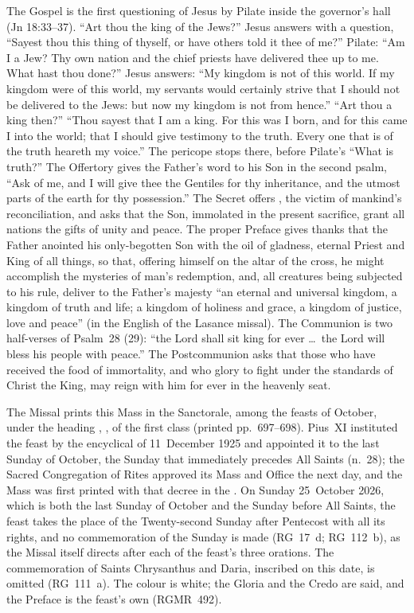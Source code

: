 The Gospel is the first questioning of Jesus by Pilate inside the governor's
hall (Jn 18:33--37). ``Art thou the king of the Jews?'' Jesus answers with a
question, ``Sayest thou this thing of thyself, or have others told it thee of
me?'' Pilate: ``Am I a Jew? Thy own nation and the chief priests have
delivered thee up to me. What hast thou done?'' Jesus answers: ``My kingdom is not of this world. If my kingdom were of this
world, my servants would certainly strive that I should not be delivered to
the Jews: but now my kingdom is not from hence.'' ``Art thou a king then?''
``Thou sayest that I am a king. For this was I born, and for this came I into
the world; that I should give testimony to the truth. Every one that is of
the truth heareth my voice.'' The pericope stops there, before Pilate's ``What
is truth?'' The Offertory gives the Father's word to his Son in the second
psalm, ``Ask of me, and I will give thee the Gentiles for thy inheritance, and
the utmost parts of the earth for thy possession.'' The Secret offers
, the victim of mankind's
reconciliation, and asks that the Son, immolated in the present sacrifice,
grant all nations the gifts of unity and peace. The proper Preface gives
thanks that the Father anointed his only-begotten Son with the oil of
gladness, eternal Priest and King of all things, so that, offering himself
on the altar of the cross, he might accomplish the mysteries of man's
redemption, and, all creatures being subjected to his rule, deliver to the
Father's majesty ``an eternal and universal kingdom, a kingdom of truth and
life; a kingdom of holiness and grace, a kingdom of justice, love and peace''
(in the English of the Lasance missal). The Communion is two half-verses of
Psalm~28 (29): ``the Lord shall sit king for ever \dots\ the Lord will bless
his people with peace.'' The Postcommunion asks that those who have received
the food of immortality, and who glory to fight under the standards of
Christ the King, may reign with him for ever in the heavenly seat.

The Missal prints this Mass in the Sanctorale, among the feasts of October,
under the heading , , of the first class (printed pp.~697--698). Pius~XI instituted the feast
by the encyclical  of 11~December 1925 and appointed it to the
last Sunday of October, the Sunday that immediately precedes All Saints
(n.~28); the Sacred Congregation of Rites approved its Mass and Office the next
day, and the Mass was first printed with that decree in the . On Sunday 25~October 2026, which is both the last Sunday of
October and the Sunday before All Saints, the feast takes the place of the
Twenty-second Sunday after Pentecost with all its rights, and no commemoration
of the Sunday is made (RG~17~d; RG~112~b), as the Missal itself directs
after each of the feast's three orations. The commemoration of Saints Chrysanthus and
Daria, inscribed on this date, is omitted (RG~111~a). The colour is white; the
Gloria and the Credo are said, and the Preface is the feast's own (RGMR~492).

